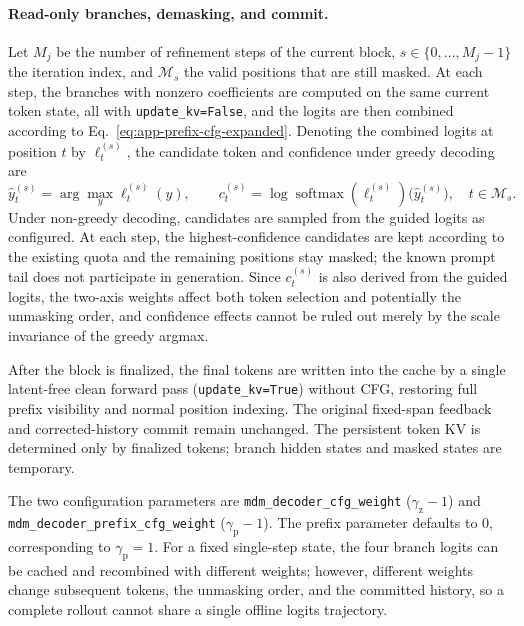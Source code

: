 \paragraph{Read-only branches, demasking, and commit.}
Let $M_j$ be the number of refinement steps of the current block, $s\in\{0,\ldots,M_j-1\}$ the iteration index, and $\mathcal M_s$ the valid positions that are still masked. At each step, the branches with nonzero coefficients are computed on the same current token state, all with \texttt{update\_kv=False}, and the logits are then combined according to Eq.~\eqref{eq:app-prefix-cfg-expanded}. Denoting the combined logits at position $t$ by $\ell_t^{(s)}$, the candidate token and confidence under greedy decoding are
\begin{equation}
    \widehat y_t^{(s)}=\arg\max_y\ell_t^{(s)}(y),
    \qquad
    c_t^{(s)}=\log\operatorname{softmax}(\ell_t^{(s)})
                    \big(\widehat y_t^{(s)}\big),
    \quad t\in\mathcal M_s.
    \label{eq:app-prefix-cfg-confidence}
\end{equation}
Under non-greedy decoding, candidates are sampled from the guided logits as configured. At each step, the highest-confidence candidates are kept according to the existing quota and the remaining positions stay masked; the known prompt tail does not participate in generation. Since $c_t^{(s)}$ is also derived from the guided logits, the two-axis weights affect both token selection and potentially the unmasking order, and confidence effects cannot be ruled out merely by the scale invariance of the greedy argmax.

After the block is finalized, the final tokens are written into the cache by a single latent-free clean forward pass (\texttt{update\_kv=True}) without CFG, restoring full prefix visibility and normal position indexing. The original fixed-span feedback and corrected-history commit remain unchanged. The persistent token KV is determined only by finalized tokens; branch hidden states and masked states are temporary.

The two configuration parameters are \texttt{mdm\_decoder\_cfg\_weight} ($\gamma_{\mathrm z}-1$) and \texttt{mdm\_decoder\_prefix\_cfg\_weight} ($\gamma_{\mathrm p}-1$). The prefix parameter defaults to $0$, corresponding to $\gamma_{\mathrm p}=1$. For a fixed single-step state, the four branch logits can be cached and recombined with different weights; however, different weights change subsequent tokens, the unmasking order, and the committed history, so a complete rollout cannot share a single offline logits trajectory.

